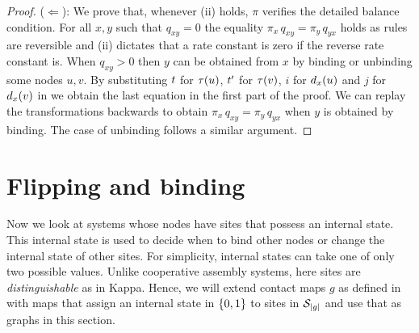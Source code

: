 \begin{proof}
  ($\Leftarrow$):
  We prove that, whenever (ii) holds,
  $\pi$ verifies the detailed balance condition.
  For all $x,y$ such that $q_{xy} = 0$
  the equality $\pi_x\,q_{xy} = \pi_y\,q_{yx}$ holds
  as rules are reversible and (ii) dictates that
  a rate constant is zero if the reverse rate constant is.
  When $q_{xy} > 0$ then $y$ can be obtained from $x$
  by binding or unbinding some nodes $u,v$.
  By substituting $t$ for $\tau(u)$, $t'$ for $\tau(v)$,
  $i$ for $d_x(u)$ and $j$ for $d_x(v)$
  in  we obtain the last equation
  in the first part of the proof.
  We can replay the transformations backwards
  to obtain $\pi_x\,q_{xy} = \pi_y\,q_{yx}$
  when $y$ is obtained by binding.
  The case of unbinding follows a similar argument.
\end{proof}


\section{Flipping and binding} %
\label{sec:fb}

Now we look at systems whose nodes have sites
that possess an internal state.
This internal state is used to decide when to bind other nodes
or change the internal state of other sites.
For simplicity, internal states can
take one of only two possible values. %
Unlike cooperative assembly systems,
here sites are \emph{distinguishable}
as in Kappa.
Hence, we will extend contact maps $g$ as defined in 
with maps that assign an internal state in $\left\{ 0,1 \right\}$
to sites in $\mathcal{S}_{\left|g\right|}$
and use that as graphs in this section.

